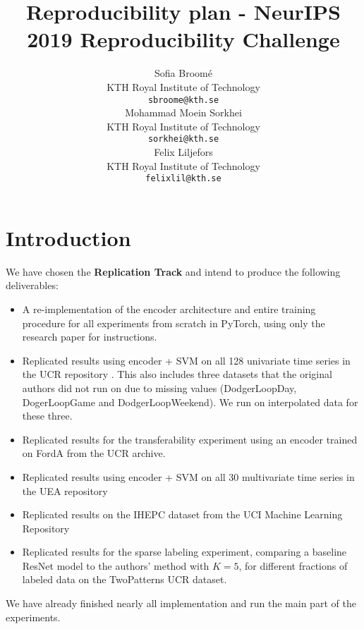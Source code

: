 \documentclass{article}
\title{Reproducibility plan - NeurIPS 2019 Reproducibility Challenge}
\author{%
  Sofia Broomé \\
  KTH Royal Institute of Technology \\
  \texttt{sbroome@kth.se} \\
  \And
  Mohammad Moein Sorkhei \\
  KTH Royal Institute of Technology \\
  \texttt{sorkhei@kth.se} \\
  \And
  Felix Liljefors \\
  KTH Royal Institute of Technology \\
  \texttt{felixlil@kth.se} \\
}
\begin{document}
\maketitle

\section{Introduction}
We have chosen the \textbf{Replication Track} and intend to produce the following deliverables:
\begin{itemize}
    \item  A re-implementation of the encoder architecture and entire training procedure for all experiments from scratch in PyTorch, using only the research paper for instructions.
    \item Replicated results using encoder + SVM on all 128 univariate time series in the UCR repository \citep{UCRArchive2018}. This also includes three datasets that the original authors did not run on due to missing values (DodgerLoopDay, DogerLoopGame and DodgerLoopWeekend). We run on interpolated data for these three.
    \item Replicated results for the transferability experiment using an encoder trained on FordA from the UCR archive.
    \item Replicated results using encoder + SVM on all 30 multivariate time series in the UEA repository \citep{bagnall2018uea}
    \item Replicated results on the IHEPC dataset from the UCI Machine Learning Repository \citep{Dua:2019}
    \item Replicated results for the sparse labeling experiment, comparing a baseline ResNet model to the authors' method with $K=5$, for different fractions of labeled data on the TwoPatterns UCR dataset.
\end{itemize}

We have already finished nearly all implementation and run the main part of the experiments.


\end{document}
